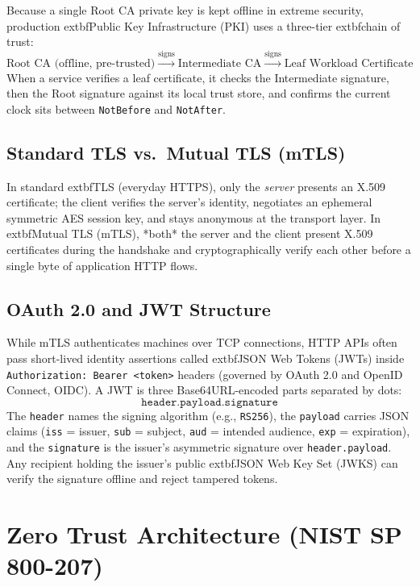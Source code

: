 Because a single Root CA private key is kept offline in extreme security, production 	extbf{Public Key Infrastructure (PKI)} uses a three-tier 	extbf{chain of trust}:
\begin{equation*}
\text{Root CA (offline, pre-trusted)} \xrightarrow{\text{signs}} \text{Intermediate CA} \xrightarrow{\text{signs}} \text{Leaf Workload Certificate}
\end{equation*}
When a service verifies a leaf certificate, it checks the Intermediate signature, then the Root signature against its local trust store, and confirms the current clock sits between \texttt{NotBefore} and \texttt{NotAfter}.

\subsection{Standard TLS vs.\ Mutual TLS (mTLS)}
In standard 	extbf{TLS} (everyday HTTPS), only the \emph{server} presents an X.509 certificate; the client verifies the server's identity, negotiates an ephemeral symmetric AES session key, and stays anonymous at the transport layer. In 	extbf{Mutual TLS (mTLS)}, *both* the server and the client present X.509 certificates during the handshake and cryptographically verify each other before a single byte of application HTTP flows.

\subsection{OAuth 2.0 and JWT Structure}
While mTLS authenticates machines over TCP connections, HTTP APIs often pass short-lived identity assertions called 	extbf{JSON Web Tokens (JWTs)} inside \texttt{Authorization: Bearer <token>} headers (governed by OAuth 2.0 and OpenID Connect, OIDC). A JWT is three Base64URL-encoded parts separated by dots:
\begin{equation*}
\texttt{header.payload.signature}
\end{equation*}
The \texttt{header} names the signing algorithm (e.g., \texttt{RS256}), the \texttt{payload} carries JSON claims (\texttt{iss} = issuer, \texttt{sub} = subject, \texttt{aud} = intended audience, \texttt{exp} = expiration), and the \texttt{signature} is the issuer's asymmetric signature over \texttt{header.payload}. Any recipient holding the issuer's public 	extbf{JSON Web Key Set (JWKS)} can verify the signature offline and reject tampered tokens.

\section{Zero Trust Architecture (NIST SP 800-207)}

